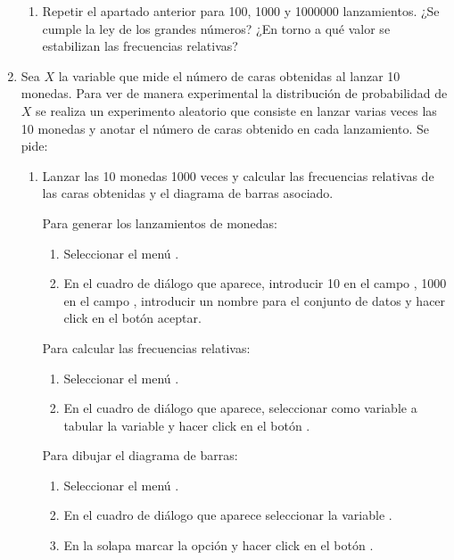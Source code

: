 \begin{enumerate}[leftmargin=*]
{\begin{enumerate}
\item Repetir el apartado anterior para 100, 1000 y 1000000 lanzamientos. ¿Se cumple la ley de los grandes números?
¿En torno a qué valor se estabilizan las frecuencias relativas?
\end{enumerate}
}

\item Sea $X$ la variable que mide el número de caras obtenidas al lanzar 10 monedas. Para ver de manera experimental
la distribución de probabilidad de $X$ se realiza un experimento aleatorio que consiste en lanzar varias veces las 10
monedas y anotar el número de caras obtenido en cada lanzamiento. Se pide:
\begin{enumerate}
\item Lanzar las 10 monedas 1000 veces y calcular las frecuencias relativas de las caras obtenidas y el diagrama de
barras asociado.
\begin{indicacion}{Para generar los lanzamientos de monedas:
\begin{enumerate}
\item Seleccionar el menú .
\item En el cuadro de diálogo que aparece, introducir 10 en el campo , 1000 en el campo
, introducir un nombre para el conjunto de datos y hacer click en el
botón aceptar.
\end{enumerate}
Para calcular las frecuencias relativas:
\begin{enumerate}
\item Seleccionar el menú .
\item En el cuadro de diálogo que aparece, seleccionar como variable a tabular la variable  y hacer click
en el botón .
\end{enumerate}
Para dibujar el diagrama de barras:
\begin{enumerate}
\item Seleccionar el menú .
\item En el cuadro de diálogo que aparece seleccionar la variable .
\item En la solapa  marcar la opción  y hacer click en el
botón .
\end{enumerate}}
\end{indicacion}


\end{enumerate}
\end{enumerate}
